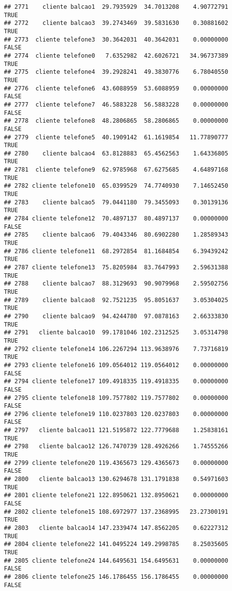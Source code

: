\documentclass[
]{article}
\begin{document}
\begin{verbatim}
## 2771    cliente balcao1  29.7935929  34.7013208    4.90772791     TRUE
## 2772    cliente balcao3  39.2743469  39.5831630    0.30881602     TRUE
## 2773  cliente telefone3  30.3642031  40.3642031    0.00000000    FALSE
## 2774  cliente telefone0   7.6352982  42.6026721   34.96737389     TRUE
## 2775  cliente telefone4  39.2928241  49.3830776    6.78040550     TRUE
## 2776  cliente telefone6  43.6088959  53.6088959    0.00000000    FALSE
## 2777  cliente telefone7  46.5883228  56.5883228    0.00000000    FALSE
## 2778  cliente telefone8  48.2806865  58.2806865    0.00000000    FALSE
## 2779  cliente telefone5  40.1909142  61.1619854   11.77890777     TRUE
## 2780    cliente balcao4  63.8128883  65.4562563    1.64336805     TRUE
## 2781  cliente telefone9  62.9785968  67.6275685    4.64897168     TRUE
## 2782 cliente telefone10  65.0399529  74.7740930    7.14652450     TRUE
## 2783    cliente balcao5  79.0441180  79.3455093    0.30139136     TRUE
## 2784 cliente telefone12  70.4897137  80.4897137    0.00000000    FALSE
## 2785    cliente balcao6  79.4043346  80.6902280    1.28589343     TRUE
## 2786 cliente telefone11  68.2972854  81.1684854    6.39439242     TRUE
## 2787 cliente telefone13  75.8205984  83.7647993    2.59631388     TRUE
## 2788    cliente balcao7  88.3129693  90.9079968    2.59502756     TRUE
## 2789    cliente balcao8  92.7521235  95.8051637    3.05304025     TRUE
## 2790    cliente balcao9  94.4244780  97.0878163    2.66333830     TRUE
## 2791   cliente balcao10  99.1781046 102.2312525    3.05314798     TRUE
## 2792 cliente telefone14 106.2267294 113.9638976    7.73716819     TRUE
## 2793 cliente telefone16 109.0564012 119.0564012    0.00000000    FALSE
## 2794 cliente telefone17 109.4918335 119.4918335    0.00000000    FALSE
## 2795 cliente telefone18 109.7577802 119.7577802    0.00000000    FALSE
## 2796 cliente telefone19 110.0237803 120.0237803    0.00000000    FALSE
## 2797   cliente balcao11 121.5195872 122.7779688    1.25838161     TRUE
## 2798   cliente balcao12 126.7470739 128.4926266    1.74555266     TRUE
## 2799 cliente telefone20 119.4365673 129.4365673    0.00000000    FALSE
## 2800   cliente balcao13 130.6294678 131.1791838    0.54971603     TRUE
## 2801 cliente telefone21 122.8950621 132.8950621    0.00000000    FALSE
## 2802 cliente telefone15 108.6972977 137.2368995   23.27300191     TRUE
## 2803   cliente balcao14 147.2339474 147.8562205    0.62227312     TRUE
## 2804 cliente telefone22 141.0495224 149.2998785    8.25035605     TRUE
## 2805 cliente telefone24 144.6495631 154.6495631    0.00000000    FALSE
## 2806 cliente telefone25 146.1786455 156.1786455    0.00000000    FALSE

\end{verbatim}
\end{document}
